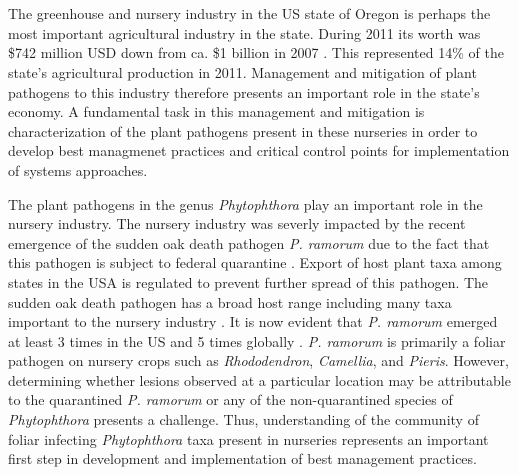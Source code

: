 \documentclass[12pt]{article}
\begin{document}
\noindent\makebox[\linewidth]{\rule{\textwidth}{1pt}} 




\section*{} %

\linenumbers


The greenhouse and nursery industry in the US state of Oregon is perhaps the most important agricultural industry in the state.  During 2011 its worth was \$742 million USD down from ca. \$1 billion in 2007 \cite{oda_2012}.  This represented 14\% of the state's agricultural production in 2011.  Management and mitigation of plant pathogens to this industry therefore presents an important role in the state's economy.  A fundamental task in this management and mitigation is characterization of the plant pathogens present in these nurseries in order to develop best managmenet practices and critical control points for implementation of systems approaches\cite{parke_grunwald_2012}.

The plant pathogens in the genus \emph{Phytophthora} play an important role in the nursery industry. The nursery industry was severly impacted by the recent emergence of the sudden oak death pathogen \emph{P. ramorum} due to the fact that this pathogen is subject to federal quarantine \cite{werres_etal_2001,grunwald_etal_2008}.  Export of host plant taxa among states in the USA is regulated to prevent further spread of this pathogen.  The sudden oak death pathogen has a broad host range including many taxa important to the nursery industry \cite{tooley_etal_2004, hansen_etal_2005}.  It is now evident that \emph{P. ramorum} emerged at least 3 times in the US and 5 times globally \cite{grunwald_etal_2012,van_poucke_etal_2012}. \emph{P. ramorum} is primarily a foliar pathogen on nursery crops such as \emph{Rhododendron}, \emph{Camellia}, and \emph{Pieris}. However, determining whether lesions observed at a particular location may be attributable to the quarantined \emph{P. ramorum} or any of the non-quarantined species of \emph{Phytophthora} presents a challenge.  Thus, understanding of the community of foliar infecting \emph{Phytophthora} taxa present in nurseries represents an important first step in development and implementation of best management practices.
\end{document}
